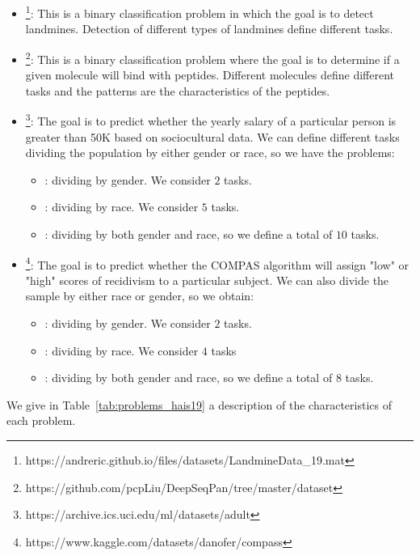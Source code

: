 \begin{itemize}
    \item {}\footnote{https://andreric.github.io/files/datasets/LandmineData\_19.mat}: This is a binary classification problem in which the goal is to detect landmines. Detection of different types of landmines define different tasks. 
    \item {}\footnote{https://github.com/pcpLiu/DeepSeqPan/tree/master/dataset}: This is a binary classification problem where the goal is to determine if a given molecule will bind with peptides. Different molecules define different tasks and the patterns are the characteristics of the peptides.
    \item {}\footnote{https://archive.ics.uci.edu/ml/datasets/adult}: The goal is to predict whether the yearly salary of a particular person is greater than 50K based on sociocultural data. We can define different tasks dividing the population by either gender or race, so we have the problems:
    \begin{itemize}
        \item {}: dividing by gender. We consider $2$ tasks.
        \item {}: dividing by race. We consider $5$ tasks.
        \item {}: dividing by both gender and race, so we define a total of $10$ tasks.
    \end{itemize}
    \item {}\footnote{https://www.kaggle.com/datasets/danofer/compass}: The goal is to predict whether the COMPAS algorithm will assign "low" or "high" scores of recidivism to a particular subject. We can also divide the sample by either race or gender, so we obtain:
    \begin{itemize}
        \item {}: dividing by gender. We consider $2$ tasks.
        \item {}: dividing by race. We consider $4$ tasks
        \item {}: dividing by both gender and race, so we define a total of $8$ tasks.
    \end{itemize}
\end{itemize}
We give in Table~\ref{tab:problems_hais19} a description of the characteristics of each problem.

